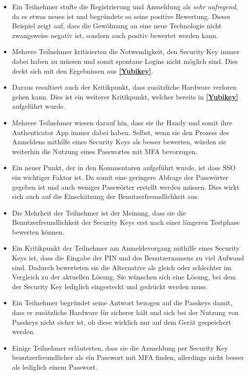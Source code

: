 \begin{itemize}
    \item Ein Teilnehmer stufte die Registrierung und Anmeldung als \glqq\textit{sehr aufregend}\grqq, da es etwas neues ist und begründete so seine positive Bewertung. Dieses Beispiel zeigt auf, dass die Gewöhnung an eine neue Technologie nicht zwangsweise negativ ist, sondern auch positiv bewertet werden kann.
    \item Mehrere Teilnehmer kritisierten die Notwendigkeit, den Security Key immer dabei haben zu müssen und somit spontane Logins nicht möglich sind. Dies deckt sich mit den Ergebnissen aus \textbf{\ref{Yubikey}}.
    \item Daraus resultiert auch der Kritikpunkt, dass zusätzliche Hardware verloren gehen kann. Dies ist ein weiterer Kritikpunkt, welcher bereits in \textbf{\ref{Yubikey}} aufgeführt wurde.
    \item Mehrere Teilnehmer wiesen darauf hin, dass sie ihr Handy und somit ihre Authenticator App immer dabei haben. Selbst, wenn sie den Prozess des Anmeldens mithilfe eines Security Keys als besser bewerten, würden sie weiterhin die Nutzung eines Passwortes mit \ac{MFA} bevorzugen. 
    \item Ein neuer Punkt, der in den Kommentaren aufgeführt wurde, ist dass \ac{SSO} ein wichtiger Faktor ist. Da somit eine geringere Abfrage der Passwörter gegeben ist und auch weniger Passwörter erstellt werden müssen. Dies wirkt sich auch auf die Einschätzung der Benutzerfreundlichkeit aus.
    \item Die Mehrheit der Teilnehmer ist der Meinung, dass sie die Benutzerfreundlichkeit der Security Keys erst nach einer längeren Testphase bewerten können.
    \item Ein Kritikpunkt der Teilnehmer am Anmeldevorgang mithilfe eines Security Keys ist, dass die Eingabe der PIN und des Benutzernamens zu viel Aufwand sind. Dadurch bewerteten sie die Alternative als gleich oder schlechter im Vergleich zu der aktuellen Lösung. Sie wünschen sich eine Lösung, bei dem der Security Key lediglich eingesteckt und gedrückt werden muss.
    \item Ein Teilnehmer begründet seine Antwort bezogen auf die Passkeys damit, dass er zusätzliche Hardware für sicherer hält und sich bei der Nutzung von Passkeys nicht sicher ist, ob diese wirklich nur auf dem Gerät gespeichert werden.
    \item Einige Teilnehmer erläuterten, dass sie die Anmeldung per Security Key benutzerfreundlicher als ein Passwort mit \ac{MFA} finden, allerdings nicht besser als lediglich einem Passwort.

\end{itemize}
